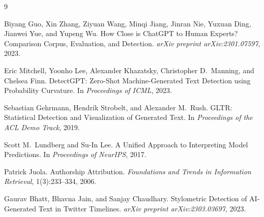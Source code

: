 \documentclass[sigconf]{acmart}
\begin{document}
\renewcommand{\refname}{参考文献}
\renewcommand{\bibname}{参考文献}

\begin{thebibliography}{9}

Biyang Guo, Xin Zhang, Ziyuan Wang, Minqi Jiang, Jinran Nie, Yuxuan Ding, Jianwei Yue, and Yupeng Wu.
\newblock How Close is ChatGPT to Human Experts? Comparison Corpus, Evaluation, and Detection.
\newblock \textit{arXiv preprint arXiv:2301.07597}, 2023.

Eric Mitchell, Yoonho Lee, Alexander Khazatsky, Christopher D.\ Manning, and Chelsea Finn.
\newblock DetectGPT: Zero-Shot Machine-Generated Text Detection using Probability Curvature.
\newblock In \textit{Proceedings of ICML}, 2023.

Sebastian Gehrmann, Hendrik Strobelt, and Alexander M.\ Rush.
\newblock GLTR: Statistical Detection and Visualization of Generated Text.
\newblock In \textit{Proceedings of the ACL Demo Track}, 2019.

Scott M.\ Lundberg and Su-In Lee.
\newblock A Unified Approach to Interpreting Model Predictions.
\newblock In \textit{Proceedings of NeurIPS}, 2017.

Patrick Juola.
\newblock Authorship Attribution.
\newblock \textit{Foundations and Trends in Information Retrieval}, 1(3):233--334, 2006.

Gaurav Bhatt, Bhavna Jain, and Sanjay Chaudhary.
\newblock Stylometric Detection of AI-Generated Text in Twitter Timelines.
\newblock \textit{arXiv preprint arXiv:2303.03697}, 2023.

\end{thebibliography}
\end{document}
